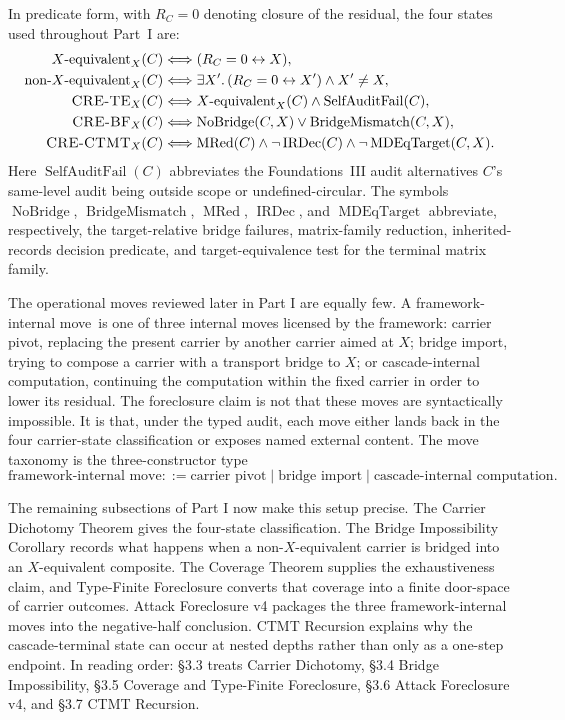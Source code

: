 \documentclass[11pt]{article}
\newcommand{\Xequiv}{$X$-equivalent}
\newcommand{\nonXequiv}{non-$X$-equivalent}
\newcommand{\CRETE}{\textsc{CRE-TE}}
\newcommand{\CREBF}{\textsc{CRE-BF}}
\newcommand{\CRECTMT}{\textsc{CRE-CTMT}}
\newcommand{\fim}{framework-internal move}
\newcommand{\carrierPivot}{carrier pivot}
\newcommand{\bridgeImport}{bridge import}
\newcommand{\cascadeInternal}{cascade-internal computation}
\theoremstyle{definition}
\begin{document}
In predicate form, with \(R_C=0\) denoting closure of the residual,
the four states used throughout Part~I are:
\[
\begin{aligned}
  \mbox{\Xequiv}_X(C)
    &\Longleftrightarrow (R_C=0 \leftrightarrow X),\\
  \mbox{\nonXequiv}_X(C)
    &\Longleftrightarrow
      \exists X'.\, (R_C=0 \leftrightarrow X')\wedge X'\neq X,\\
  \mbox{\CRETE}_X(C)
    &\Longleftrightarrow
      \mbox{\Xequiv}_X(C)\wedge
      \operatorname{SelfAuditFail}(C),\\
  \mbox{\CREBF}_X(C)
    &\Longleftrightarrow
      \operatorname{NoBridge}(C,X)\vee
      \operatorname{BridgeMismatch}(C,X),\\
  \mbox{\CRECTMT}_X(C)
    &\Longleftrightarrow
      \operatorname{MRed}(C)\wedge
      \neg\operatorname{IRDec}(C)\wedge
      \neg\operatorname{MDEqTarget}(C,X).
\end{aligned}
\]
Here \(\operatorname{SelfAuditFail}(C)\) abbreviates the
Foundations~III audit alternatives \(C\)'s same-level audit being
outside scope or undefined-circular.  The symbols
\(\operatorname{NoBridge}\), \(\operatorname{BridgeMismatch}\),
\(\operatorname{MRed}\), \(\operatorname{IRDec}\), and
\(\operatorname{MDEqTarget}\) abbreviate, respectively, the
target-relative bridge failures, matrix-family reduction,
inherited-records decision predicate, and target-equivalence test for
the terminal matrix family.

The operational moves reviewed later in Part I are equally few.  A
\fim\ is one of three internal moves licensed by the framework:
\carrierPivot, replacing the present carrier by another carrier aimed
at \(X\); \bridgeImport, trying to compose a carrier with a transport
bridge to \(X\); or \cascadeInternal, continuing the computation within
the fixed carrier in order to lower its residual.  The foreclosure
claim is not that these moves are syntactically impossible.  It is
that, under the typed audit, each move either lands back in the four
carrier-state classification or exposes named external content.
The move taxonomy is the three-constructor type
\[
  \mbox{\fim} ::= \mbox{\carrierPivot}
      \mid \mbox{\bridgeImport}
      \mid \mbox{\cascadeInternal}.
\]

The remaining subsections of Part I now make this setup precise.  The
Carrier Dichotomy Theorem gives the four-state classification.  The
Bridge Impossibility Corollary records what happens when a
non-\(X\)-equivalent carrier is bridged into an \(X\)-equivalent
composite.  The
Coverage Theorem supplies the exhaustiveness claim, and Type-Finite
Foreclosure converts that coverage into a finite door-space of carrier
outcomes.  Attack Foreclosure v4 packages the three framework-internal
moves into the negative-half conclusion.  CTMT Recursion explains why
the cascade-terminal state can occur at nested depths rather than only
as a one-step endpoint.  In reading order: §3.3 treats Carrier
Dichotomy, §3.4 Bridge Impossibility, §3.5 Coverage and Type-Finite
Foreclosure, §3.6 Attack Foreclosure v4, and §3.7 CTMT Recursion.
\end{document}

